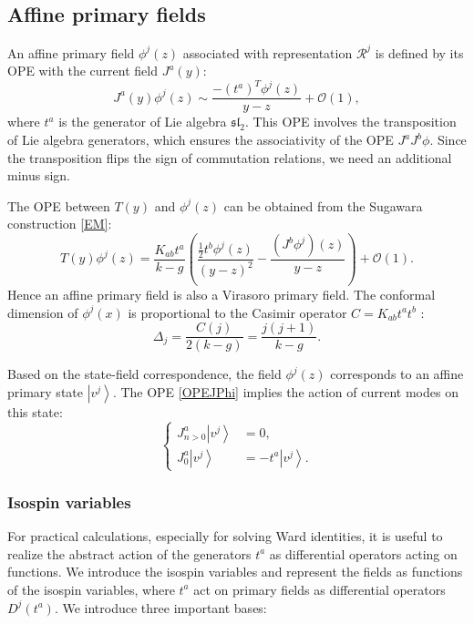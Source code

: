 \documentclass[10pt,a4paper]{article}
\numberwithin{equation}{section}
\newcommand{\ket}[1]{\left| #1 \right\rangle}
\begin{document}
\subsection{Affine primary fields}
An affine primary field $\phi^{j}(z)$ associated with representation $\mathcal{R}^{j}$ is defined by its OPE with the current field 
$J^{a}(y)$:
\begin{equation}
    \boxed{
        J^{a}(y) \phi^{j}(z) \sim \frac{-(t^{a})^{T} \phi^{j}(z)}{y-z} + \mathcal{O}(1), \label{OPEJPhi}
    }
\end{equation}
where $t^{a}$ is the generator of Lie algebra $\mathfrak{sl}_{2}$. This OPE involves the transposition of Lie algebra generators, which 
ensures the associativity of the OPE $J^{a}J^{b} \phi$. Since the transposition flips the sign of commutation relations, we need an additional 
minus sign.

The OPE between $T(y)$ and $\phi^{j}(z)$ can be obtained from the Sugawara construction \eqref{EM}:
\begin{equation}
    T(y) \phi^{j}(z) = \frac{K_{ab} t^{a}}{k-g} \left( \frac{\frac{1}{2} t^{b} \phi^{j}(z)}{(y-z)^{2}} - \frac{\left(J^{b} \phi^{j}\right)(z)}{y-z} \right) + \mathcal{O}(1).
\end{equation}
Hence an affine primary field is also a Virasoro primary field. 
The conformal dimension of $\phi^{j}(x)$ is proportional to the Casimir operator $C = K_{ab} t^{a} t^{b}$ :
\begin{equation}
    \boxed{
        \Delta_{j} = \frac{C(j)}{2(k-g)} = \frac{j(j+1)}{k-g}.
    }
\end{equation}

Based on the state-field correspondence, the field $\phi^{j}(z)$ corresponds to an affine primary state $\ket{v^{j}}$. 
The OPE \eqref{OPEJPhi} implies the action of current modes on this state:
\begin{equation}
    \left\{
        \begin{aligned}
            J^{a}_{n>0} \ket{v^{j}} &= 0,\\
            J^{a}_{0} \ket{v^{j}} &= - t^{a} \ket{v^{j}}.
        \end{aligned}
    \right.
\end{equation}

\subsubsection*{Isospin variables}
For practical calculations, especially for solving Ward identities, it is useful to realize the abstract action of the generators 
$t^{a}$ as differential operators acting on functions. We introduce the isospin variables and 
represent the fields as functions of the isospin variables, 
where $t^{a}$ act on primary fields as differential operators $D^{j}(t^{a})$. We introduce three important bases:
\end{document}
